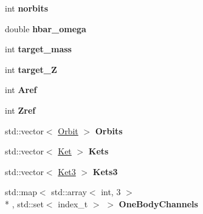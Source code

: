 \begin{DoxyCompactItemize}
\item 
\hypertarget{classModelSpace_af5970e6865dd69177eb0f74fa269ff17}{int {\bfseries norbits}}\label{classModelSpace_af5970e6865dd69177eb0f74fa269ff17}

\item 
\hypertarget{classModelSpace_ac443b316ecf89bf3476ba6f541f3563c}{double {\bfseries hbar\-\_\-omega}}\label{classModelSpace_ac443b316ecf89bf3476ba6f541f3563c}

\item 
\hypertarget{classModelSpace_ac0ef9c553ca3db16a019205d6c8a2b26}{int {\bfseries target\-\_\-mass}}\label{classModelSpace_ac0ef9c553ca3db16a019205d6c8a2b26}

\item 
\hypertarget{classModelSpace_a6fc5c2a8fed28f70114a3dd81b93fe74}{int {\bfseries target\-\_\-\-Z}}\label{classModelSpace_a6fc5c2a8fed28f70114a3dd81b93fe74}

\item 
\hypertarget{classModelSpace_a81d21aa5d47ef8cdcd00cd166fc5a561}{int {\bfseries Aref}}\label{classModelSpace_a81d21aa5d47ef8cdcd00cd166fc5a561}

\item 
\hypertarget{classModelSpace_aa6f60ad193a7602da82501d0f76a00ca}{int {\bfseries Zref}}\label{classModelSpace_aa6f60ad193a7602da82501d0f76a00ca}

\item 
\hypertarget{classModelSpace_ad382c9f244fa3a70aba2a328d3326751}{std\-::vector$<$ \hyperlink{structOrbit}{Orbit} $>$ {\bfseries Orbits}}\label{classModelSpace_ad382c9f244fa3a70aba2a328d3326751}

\item 
\hypertarget{classModelSpace_a27f8b0e00ffcf55ddb8e3459948e905e}{std\-::vector$<$ \hyperlink{structKet}{Ket} $>$ {\bfseries Kets}}\label{classModelSpace_a27f8b0e00ffcf55ddb8e3459948e905e}

\item 
\hypertarget{classModelSpace_acd530f35fcdcb486054107b82a744f55}{std\-::vector$<$ \hyperlink{structKet3}{Ket3} $>$ {\bfseries Kets3}}\label{classModelSpace_acd530f35fcdcb486054107b82a744f55}

\item 
\hypertarget{classModelSpace_a7068cf3f8306f37df823f43b120121c0}{std\-::map$<$ std\-::array$<$ int, 3 $>$\\*
, std\-::set$<$ index\-\_\-t $>$ $>$ {\bfseries One\-Body\-Channels}}\label{classModelSpace_a7068cf3f8306f37df823f43b120121c0}


\end{DoxyCompactItemize}
